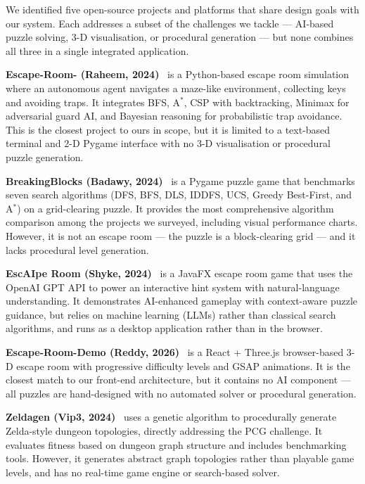 \documentclass[12pt, a4paper]{report}
\begin{document}
We identified five open-source projects and platforms that share design goals with our system.  Each addresses a subset of the challenges we tackle --- AI-based puzzle solving, 3-D visualisation, or procedural generation --- but none combines all three in a single integrated application.

\textbf{Escape-Room- (Raheem, 2024)}~\cite{gh_escaperoom} is a Python-based escape room simulation where an autonomous agent navigates a maze-like environment, collecting keys and avoiding traps.  It integrates BFS, A$^{\ast}$, CSP with backtracking, Minimax for adversarial guard AI, and Bayesian reasoning for probabilistic trap avoidance.  This is the closest project to ours in scope, but it is limited to a text-based terminal and 2-D Pygame interface with no 3-D visualisation or procedural puzzle generation.

\textbf{BreakingBlocks (Badawy, 2024)}~\cite{gh_breakingblocks} is a Pygame puzzle game that benchmarks seven search algorithms (DFS, BFS, DLS, IDDFS, UCS, Greedy Best-First, and A$^{\ast}$) on a grid-clearing puzzle.  It provides the most comprehensive algorithm comparison among the projects we surveyed, including visual performance charts.  However, it is not an escape room --- the puzzle is a block-clearing grid --- and it lacks procedural level generation.

\textbf{EscAIpe Room (Shyke, 2024)}~\cite{gh_escaipe} is a JavaFX escape room game that uses the OpenAI GPT API to power an interactive hint system with natural-language understanding.  It demonstrates AI-enhanced gameplay with context-aware puzzle guidance, but relies on machine learning (LLMs) rather than classical search algorithms, and runs as a desktop application rather than in the browser.

\textbf{Escape-Room-Demo (Reddy, 2026)}~\cite{gh_escapedemo} is a React + Three.js browser-based 3-D escape room with progressive difficulty levels and GSAP animations.  It is the closest match to our front-end architecture, but it contains no AI component --- all puzzles are hand-designed with no automated solver or procedural generation.

\textbf{Zeldagen (Vip3, 2024)}~\cite{gh_zeldagen} uses a genetic algorithm to procedurally generate Zelda-style dungeon topologies, directly addressing the PCG challenge.  It evaluates fitness based on dungeon graph structure and includes benchmarking tools.  However, it generates abstract graph topologies rather than playable game levels, and has no real-time game engine or search-based solver.
\end{document}
